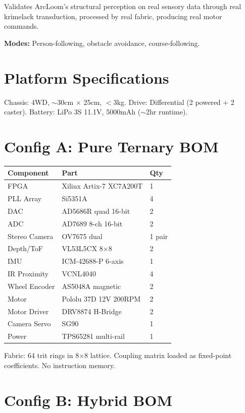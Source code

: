 \documentclass[11pt, a4paper]{report}
\begin{document}
Validates ArcLoom's structural perception on real sensory data through
real krimelack transduction, processed by real fabric, producing real
motor commands.

\textbf{Modes:} Person-following, obstacle avoidance, course-following.

\section{Platform Specifications}

Chassis: 4WD, $\sim$30cm $\times$ 25cm, $<$3kg.
Drive: Differential (2 powered + 2 caster).
Battery: LiPo 3S 11.1V, 5000mAh ($\sim$2hr runtime).

\section{Config A: Pure Ternary BOM}

\begin{center}
\begin{tabular}{@{}lll@{}}
\toprule
\textbf{Component} & \textbf{Part} & \textbf{Qty} \\
\midrule
FPGA & Xilinx Artix-7 XC7A200T & 1 \\
PLL Array & Si5351A & 4 \\
DAC & AD5686R quad 16-bit & 2 \\
ADC & AD7689 8-ch 16-bit & 2 \\
Stereo Camera & OV7675 dual & 1 pair \\
Depth/ToF & VL53L5CX 8$\times$8 & 2 \\
IMU & ICM-42688-P 6-axis & 1 \\
IR Proximity & VCNL4040 & 4 \\
Wheel Encoder & AS5048A magnetic & 2 \\
Motor & Pololu 37D 12V 200RPM & 2 \\
Motor Driver & DRV8874 H-Bridge & 2 \\
Camera Servo & SG90 & 1 \\
Power & TPS65281 multi-rail & 1 \\
\bottomrule
\end{tabular}
\end{center}

Fabric: 64 trit rings in 8$\times$8 lattice. Coupling matrix loaded as
fixed-point coefficients. No instruction memory.

\section{Config B: Hybrid BOM}
\end{document}
